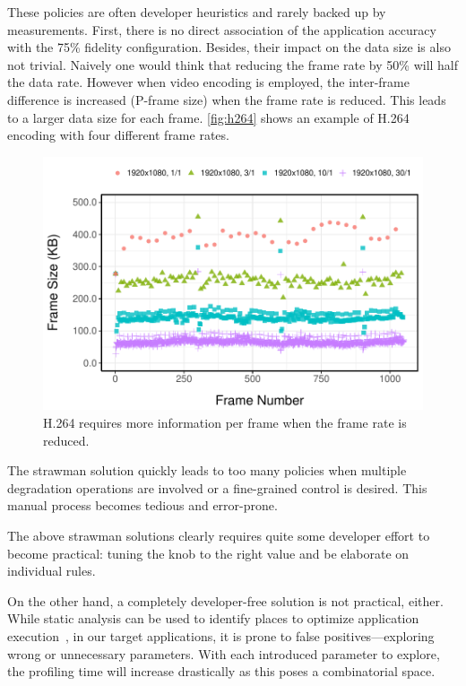  These policies are often developer heuristics and
rarely backed up by measurements. First, there is no direct association of the
application accuracy with the 75\% fidelity configuration. Besides, their impact
on the data size is also not trivial. Naively one would think that reducing the
frame rate by 50\% will half the data rate. However when video encoding is
employed, the inter-frame difference is increased (P-frame size) when the frame
rate is reduced. This leads to a larger data size for each
frame. \autoref{fig:h264} shows an example of H.264 encoding with four different
frame rates.

\begin{figure}
  \centering
  \includegraphics[width=\columnwidth]{figures/h264.pdf}
  \caption{H.264 requires more information per frame when the frame rate is
    reduced.}
  \label{fig:h264}
\end{figure}

 The strawman solution quickly leads to too many policies
when multiple degradation operations are involved or a fine-grained control is
desired. This manual process becomes tedious and error-prone.


\vspace{0.5em}

The above strawman solutions clearly requires quite some developer effort to
become practical: tuning the knob to the right value and be elaborate on
individual rules.

On the other hand, a completely developer-free solution is not practical,
either. While static analysis can be used to identify places to optimize
application execution~\cite{chun2011clonecloud}, in our target applications, it
is prone to false positives---exploring wrong or unnecessary parameters. With
each introduced parameter to explore, the profiling time will increase
drastically as this poses a combinatorial space.

